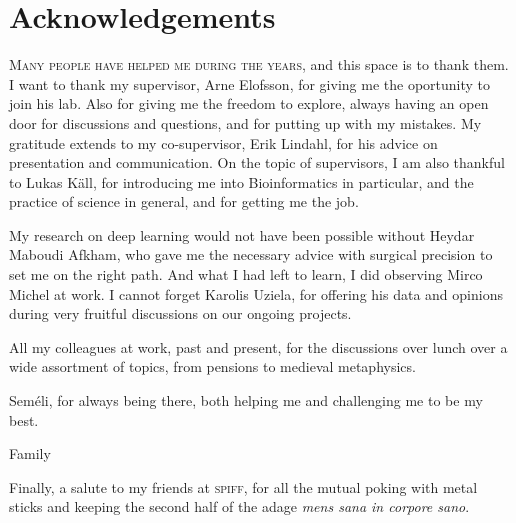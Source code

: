 \chapter*{Acknowledgements}

\lettrine[lines=3, lhang=0.15, nindent=0em]{\color{Maroon}M}{any people have helped me during the years,}
and this space is to thank them.
I want to thank my supervisor, Arne Elofsson, for giving me the oportunity to join his lab.
Also for giving me the freedom to explore, always having an open door for discussions and questions, and for putting up with my mistakes.
My gratitude extends to my co-supervisor, Erik Lindahl, for his advice on presentation and communication.
On the topic of supervisors, I am also thankful to Lukas Käll, for introducing me into Bioinformatics in particular, and the practice of science in general, and for getting me the job.


My research on deep learning would not have been possible without Heydar Maboudi Afkham, who gave me the necessary advice with surgical precision to set me on the right path.
And what I had left to learn, I did observing Mirco Michel at work.
I cannot forget Karolis Uziela, for offering his data and opinions during very fruitful discussions on our ongoing projects.

All my colleagues at work, past and present, for the discussions over lunch over a wide assortment of topics, from pensions to medieval metaphysics. 


Seméli, for always being there, both helping me and challenging me to be my best.

Family


Finally, a salute to my friends at \textsc{spiff}, for all the mutual poking with metal sticks and keeping the second half of the adage \emph{mens sana in corpore sano}.

